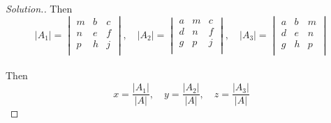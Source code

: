 \documentclass[11pt,a4paper]{article}
\theoremstyle{definition}
\newenvironment{solution}
  {\renewcommand{\qedsymbol}{}\begin{proof}[\textit{Solution}.]}
  {\end{proof}}
\begin{document}
\begin{enumerate}
\begin{solution}
Then
$$|A_1|=
\begin{vmatrix}
m & b & c\\
n & e & f\\
p & h & j\\
\end{vmatrix}
,\quad  |A_2|=
\begin{vmatrix}
a & m & c\\
d & n & f\\
g & p & j\\
\end{vmatrix}
,\quad 
|A_3|=
\begin{vmatrix}
a & b & m\\
d & e & n\\
g & h & p\\
\end{vmatrix}
$$\\

Then
$$x=\frac{|A_1|}{|A|},\quad   y=\frac{|A_2|}{|A|},\quad  z=\frac{|A_3|}{|A|}$$
\end{solution}
\end{enumerate}
\end{document}
